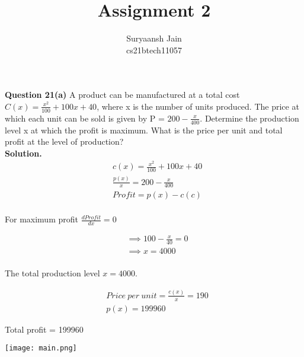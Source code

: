 \documentclass[journal,12pt,twocolumn]{IEEEtran}
\title{Assignment 2 \\}
\author{Suryaansh Jain \\ \normalsize cs21btech11057 \\}
\begin{document}
	\maketitle
	
	\textbf{Question 21(a)} 
	A product can be manufactured at a total cost $C(x) = \frac{x^{2}}{100}+100x+40$, where x
is the number of units produced. The price at which each unit can be sold is given
by P = $200 - \frac{x}{400}$. Determine the production level x at which the profit is
maximum. What is the price per unit and total profit at the level of production? \\
	
	
	\textbf{Solution.}		
	\begin{align}
		&c(x) = \frac{x^{2}}{100} + 100x + 40 \\
		&\frac{p(x)}{x} = 200 - \frac{x}{400} \\
		&Profit = p(x) - c(c)
	\end{align} \\
	
	For maximum profit $\frac{dProfit}{dx} = 0$
	
	\begin{align}
	    &\implies 100 - \frac{x}{40} = 0 \\
	    &\implies x = 4000
	\end{align}\\
	
	The total production level $x = 4000$.
	
	\begin{align}
        &Price\ per\ unit =  \frac{c(x)}{x}  = 190 \\
        &p(x)= 199960
	\end{align}
	
	Total profit = 199960
			
	
	\texttt{[image: main.png]}
	
\end{document}
